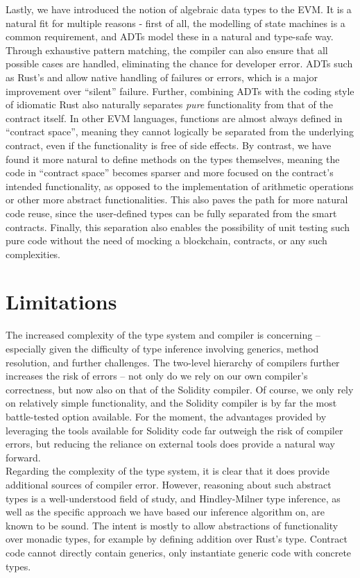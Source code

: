\par
Lastly, we have introduced the notion of algebraic data types to the EVM. It is a natural fit for multiple reasons - first of all, the modelling of state machines is a common requirement, and ADTs model these in a natural and type-safe way. Through exhaustive pattern matching, the compiler can also ensure that all possible cases are handled, eliminating the chance for developer error. ADTs such as Rust's  and  allow native handling of failures or errors, which is a major improvement over ``silent'' failure. Further, combining ADTs with the coding style of idiomatic Rust also naturally separates \textit{pure} functionality from that of the contract itself. In other EVM languages, functions are almost always defined in ``contract space'', meaning they cannot logically be separated from the underlying contract, even if the functionality is free of side effects. By contrast, we have found it more natural to define methods on the types themselves, meaning the code in ``contract space'' becomes sparser and more focused on the contract's intended functionality, as opposed to the implementation of arithmetic operations or other more abstract functionalities. This also paves the path for more natural code reuse, since the user-defined types can be fully separated from the smart contracts. Finally, this separation also enables the possibility of unit testing such pure code without the need of mocking a blockchain, contracts, or any such complexities.

\section{Limitations}
The increased complexity of the type system and compiler is concerning -- especially given the difficulty of type inference involving generics, method resolution, and further challenges. The two-level hierarchy of compilers further increases the risk of errors -- not only do we rely on our own compiler's correctness, but now also on that of the Solidity compiler. Of course, we only rely on relatively simple functionality, and the Solidity compiler is by far the most battle-tested option available. For the moment, the advantages provided by leveraging the tools available for Solidity code far outweigh the risk of compiler errors, but reducing the reliance on external tools does provide a natural way forward. \\
Regarding the complexity of the type system, it is clear that it does provide additional sources of compiler error. However, reasoning about such abstract types is a well-understood field of study, and Hindley-Milner type inference, as well as the specific approach we have based our inference algorithm on, are known to be sound. The intent is mostly to allow abstractions of functionality over monadic types, for example by defining addition over Rust's  type. Contract code cannot directly contain generics, only instantiate generic code with concrete types.

